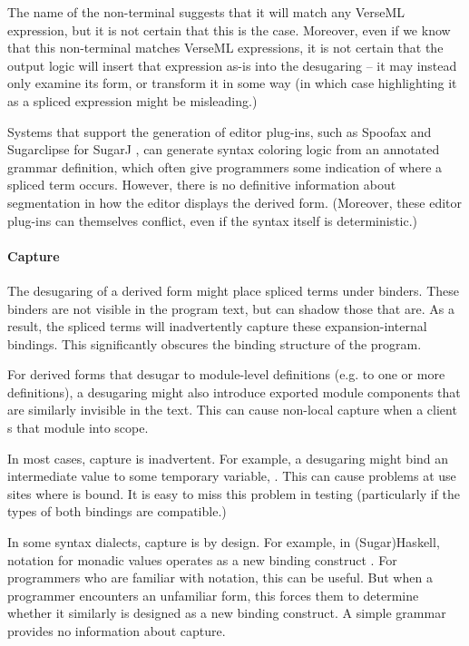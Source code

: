 {The name of the non-terminal  suggests that it will match any VerseML expression, but it is not certain that this is the case. Moreover, even if we know that this non-terminal matches VerseML expressions, it is not certain that the output logic will insert that expression as-is into the desugaring -- it may instead only examine its form, or transform it in some way (in which case highlighting it as a spliced expression might be misleading.)

Systems that support the generation of editor plug-ins, such as Spoofax \cite{kats2010spoofax} and Sugarclipse for SugarJ \cite{Erdweg:2012:GLE}, can generate syntax coloring logic from an annotated grammar definition, which often give programmers some indication of where a spliced term occurs. However, there is no definitive information about segmentation in how the editor displays the derived form. (Moreover, these editor plug-ins can themselves conflict, even if the syntax itself is deterministic.)

\paragraph{Capture} The desugaring of a derived form might place spliced terms under binders. These binders are not visible in the program text, but can shadow those that are. As a result, the spliced terms will inadvertently capture these expansion-internal bindings. This significantly obscures the binding structure of the program.

For derived forms that desugar to module-level definitions (e.g. to one or more  definitions), a desugaring might also introduce exported module components that are similarly invisible in the text. This can cause non-local capture when a client s that module into scope.

In most cases, capture is inadvertent. For example, a desugaring might bind an intermediate value to some temporary variable, . This can cause problems at use sites where  is bound. It is easy to miss this problem in testing (particularly if the types of both bindings are compatible.)

In some syntax dialects, capture is by design. For example, in (Sugar)Haskell,  notation for monadic values operates as a new binding construct \cite{erdweg2012layout}. For programmers who {are} familiar with  notation, this can be useful. But when a programmer encounters an unfamiliar form, this forces them to determine whether it similarly is designed as a new binding construct. A simple grammar provides no information about capture.%

}
